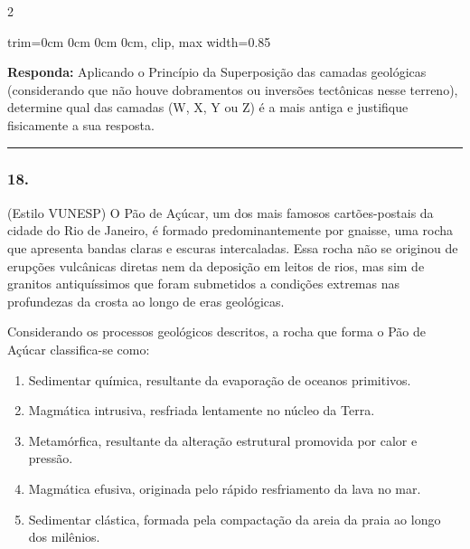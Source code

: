 \documentclass[twoside, 10pt, a4paper]{article}
\newlength{\espacoPreQuestao}
\newlength{\espacoQuestao}
\newlength{\espacoAlt}
\newcommand{\larguraTikz}{0.85\linewidth} %
\begin{document}
\begin{multicols*}{2}
\begin{center}
\begin{adjustbox}{trim=0cm 0cm 0cm 0cm, clip, max width=\larguraTikz}
\end{adjustbox}
\end{center}

\begin{boxresponda}
\textbf{Responda:} Aplicando o Princípio da Superposição das camadas geológicas (considerando que não houve dobramentos ou inversões tectônicas nesse terreno), determine qual das camadas (W, X, Y ou Z) é a mais antiga e justifique fisicamente a sua resposta.
\end{boxresponda}
\par\vspace{\espacoQuestao}

\noindent\textcolor{CorLinha}{\rule{\linewidth}{0.5pt}} 
\par\vspace{\espacoPreQuestao}
\subsubsection*{18.} (Estilo VUNESP) O Pão de Açúcar, um dos mais famosos cartões-postais da cidade do Rio de Janeiro, é formado predominantemente por gnaisse, uma rocha que apresenta bandas claras e escuras intercaladas. Essa rocha não se originou de erupções vulcânicas diretas nem da deposição em leitos de rios, mas sim de granitos antiquíssimos que foram submetidos a condições extremas nas profundezas da crosta ao longo de eras geológicas.

Considerando os processos geológicos descritos, a rocha que forma o Pão de Açúcar classifica-se como:

\begin{enumerate}[label=\alph*), itemsep=\espacoAlt]
\item Sedimentar química, resultante da evaporação de oceanos primitivos.
\item Magmática intrusiva, resfriada lentamente no núcleo da Terra.
\item Metamórfica, resultante da alteração estrutural promovida por calor e pressão.
\item Magmática efusiva, originada pelo rápido resfriamento da lava no mar.
\item Sedimentar clástica, formada pela compactação da areia da praia ao longo dos milênios.
\end{enumerate}
\par\vspace{\espacoQuestao}


\end{multicols*}
\end{document}
